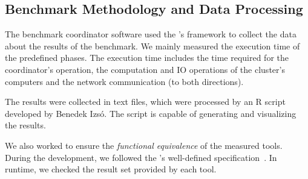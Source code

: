 \subsection{Benchmark Methodology and Data Processing}
\label{benchmark-methodology}

The benchmark coordinator software used the \tb{}'s framework to collect the data about the results of the benchmark. We mainly measured the execution time of the predefined phases. The execution time includes the time required for the coordinator's operation, the computation and IO operations of the cluster's computers and the network communication (to both directions).

The results were collected in text files, which were processed by an R script \cite{RProject} developed by Benedek Izsó. The script is capable of generating and visualizing the results. 

We also worked to ensure the \emph{functional equivalence} of the measured tools. During the development, we followed the \tb{}'s well-defined specification~\cite{ASE2013}. In runtime, we checked the result set provided by each tool.
